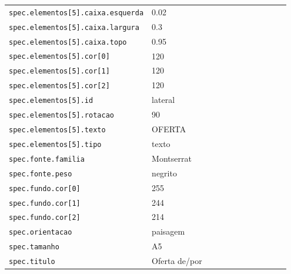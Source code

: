 \begin{tabular}{@{}p{0.35\linewidth}p{0.6\linewidth}@{}}
\texttt{spec.elementos[5].caixa.esquerda} & 0.02 \\
\texttt{spec.elementos[5].caixa.largura} & 0.3 \\
\texttt{spec.elementos[5].caixa.topo} & 0.95 \\
\texttt{spec.elementos[5].cor[0]} & 120 \\
\texttt{spec.elementos[5].cor[1]} & 120 \\
\texttt{spec.elementos[5].cor[2]} & 120 \\
\texttt{spec.elementos[5].id} & lateral \\
\texttt{spec.elementos[5].rotacao} & 90 \\
\texttt{spec.elementos[5].texto} & OFERTA \\
\texttt{spec.elementos[5].tipo} & texto \\
\texttt{spec.fonte.familia} & Montserrat \\
\texttt{spec.fonte.peso} & negrito \\
\texttt{spec.fundo.cor[0]} & 255 \\
\texttt{spec.fundo.cor[1]} & 244 \\
\texttt{spec.fundo.cor[2]} & 214 \\
\texttt{spec.orientacao} & paisagem \\
\texttt{spec.tamanho} & A5 \\
\texttt{spec.titulo} & Oferta de/por \\
\end{tabular}
